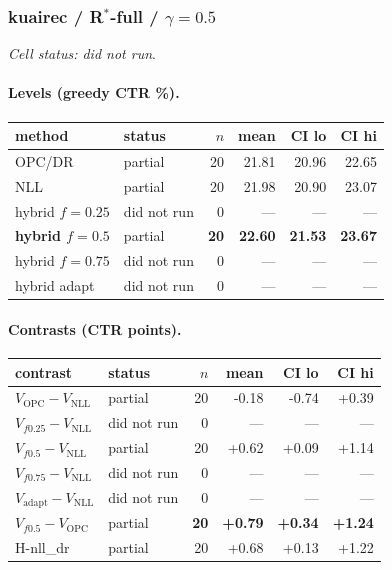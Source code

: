 \documentclass[10pt,a4paper]{article}
\begin{document}
\subsubsection{kuairec / R$^*$-full / $\gamma=0.5$}
\emph{Cell status: did not run}.
\paragraph{Levels (greedy CTR \%).}
{\centering\small\begin{tabular}{llrrrr}
\toprule method & status & $n$ & mean & CI lo & CI hi \\
\midrule
OPC/DR & partial & 20 & 21.81 & 20.96 & 22.65 \\
NLL & partial & 20 & 21.98 & 20.90 & 23.07 \\
hybrid $f{=}0.25$ & did not run & 0 & --- & --- & --- \\
\textbf{hybrid $f{=}0.5$} & partial & \textbf{20} & \textbf{22.60} & \textbf{21.53} & \textbf{23.67} \\
hybrid $f{=}0.75$ & did not run & 0 & --- & --- & --- \\
hybrid adapt & did not run & 0 & --- & --- & --- \\
\bottomrule\end{tabular}\par}
\paragraph{Contrasts (CTR points).}
{\centering\small\begin{tabular}{llrrrr}
\toprule contrast & status & $n$ & mean & CI lo & CI hi \\
\midrule
$V_{\mathrm{OPC}}-V_{\mathrm{NLL}}$ & partial & 20 & -0.18 & -0.74 & +0.39 \\
$V_{f0.25}-V_{\mathrm{NLL}}$ & did not run & 0 & --- & --- & --- \\
$V_{f0.5}-V_{\mathrm{NLL}}$ & partial & 20 & +0.62 & +0.09 & +1.14 \\
$V_{f0.75}-V_{\mathrm{NLL}}$ & did not run & 0 & --- & --- & --- \\
$V_{\mathrm{adapt}}-V_{\mathrm{NLL}}$ & did not run & 0 & --- & --- & --- \\
\textbf{$V_{f0.5}-V_{\mathrm{OPC}}$} & partial & \textbf{20} & \textbf{+0.79} & \textbf{+0.34} & \textbf{+1.24} \\
H-nll\_dr & partial & 20 & +0.68 & +0.13 & +1.22 \\
\bottomrule\end{tabular}\par}
\end{document}
